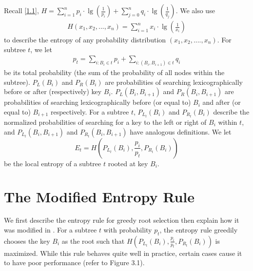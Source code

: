 \documentclass[letterpaper,12pt,titlepage,oneside,final]{book}
\theoremstyle{plain}
\begin{document}
Recall \ref{1.1}, $H = \sum_{i=1}^{n} p_i\cdot\lg(\frac{1}{p_i}) + \sum_{j=0}^{n} q_i\cdot\lg(\frac{1}{q_j})$. We also use
\begin{align*}
H(x_1,x_2,...,x_n) = \sum_{i=1}^{n} x_i\cdot\lg(\frac{1}{x_i})
\end{align*} to describe the entropy of any probability distribution $(x_1, x_2, ...., x_n)$. For subtree $t$, we let 
\begin{align*}
p_t=\sum_{i : B_i \in t} p_i + \sum_{i : (B_i, B_{i+1}) \in t} q_i
\end{align*}
 be its total probability (the sum of the probability of all nodes within the subtree). $P_{L}(B_i)$ and $P_{R}(B_i)$ are probabilities of searching lexicographically before or after (respectively) key $B_i$. $P_{L}(B_i, B_{i+1})$ and $P_{R}(B_i, B_{i+1})$ are probabilities of searching lexicographically before (or equal to) $B_i$ and after (or equal to) $B_{i+1}$ respectively. For a subtree $t$, $P_{L_t}(B_i)$ and $P_{R_t}(B_i)$ describe the normalized probabilities of searching for a key to the left or right of $B_i$ within $t$, and $P_{L_t}(B_i,B_{i+1})$ and $P_{R_t}(B_i,B_{i+1})$ have analogous definitions. 
We let  
\begin{equation}
E_t=H(P_{L_t}(B_i), \frac{p_i}{p_t}, P_{R_t}(B_i))
\end{equation} be the local entropy of a subtree $t$ rooted at key $B_i$.  

\section{The Modified Entropy Rule}\label{The Modified Entropy Rule}

We first describe the entropy rule for greedy root selection then explain how it was modified in \cite{guttler1980binary}. For a subtree $t$ with probability $p_t$, the entropy rule greedily chooses the key $B_i$ as the root such that $H(P_{L_t}(B_i), \frac{p_i}{p_t}, P_{R_t}(B_i))$ is maximized. While this rule behaves quite well in practice, certain cases cause it to have poor performance (refer to Figure 3.1). 
\end{document}
